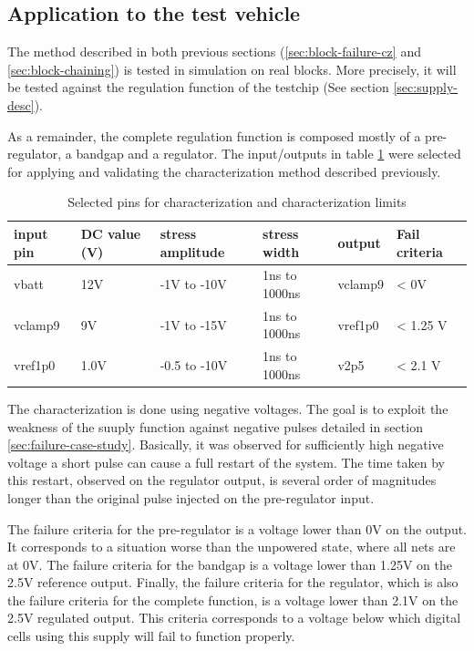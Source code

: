 \subsection{Application to the test vehicle}
\label{sec:application-test-vehicle}

The method described in both previous sections (\ref{sec:block-failure-cz} and \ref{sec:block-chaining}) is tested in simulation on real blocks.
More precisely, it will be tested against the regulation function of the testchip (See section \ref{sec:supply-desc}).

As a remainder, the complete regulation function is composed mostly of a pre-regulator, a bandgap and a regulator.
The input/outputs in table \ref{selected-pins-for-cz} were selected for applying and validating the characterization method described previously.

\begin{table}[!h]
\centering
\begin{tabular}{@{}llllll@{}}
\toprule
input pin       &  DC value (V) & stress amplitude   &  stress width   &   output      & Fail criteria \\ \midrule
vbatt           &  12V          & -1V to -10V        &  1ns to 1000ns  &   vclamp9     & < 0V             \\
vclamp9         &  9V           & -1V to -15V        &  1ns to 1000ns  &   vref1p0     & < 1.25 V         \\
vref1p0         &  1.0V         & -0.5 to -10V       &  1ns to 1000ns  &   v2p5        & < 2.1 V          \\
\bottomrule
\end{tabular}
\caption{Selected pins for characterization and characterization limits}
\label{selected-pins-for-cz}
\end{table}

The characterization is done using negative voltages.
The goal is to exploit the weakness of the suuply function against negative pulses detailed in section \ref{sec:failure-case-study}.
Basically, it was observed for sufficiently high negative voltage a short pulse can cause a full restart of the system.
The time taken by this restart, observed on the regulator output, is several order of magnitudes longer than the original pulse injected on the pre-regulator input.

The failure criteria for the pre-regulator is a voltage lower than 0V on the output.
It corresponds to a situation worse than the unpowered state, where all nets are at 0V.
The failure criteria for the bandgap is a voltage lower than 1.25V on the 2.5V reference output.
Finally, the failure criteria for the regulator, which is also the failure criteria for the complete function, is a voltage lower than 2.1V on the 2.5V regulated output.
This criteria corresponds to a voltage below which digital cells using this supply will fail to function properly.

